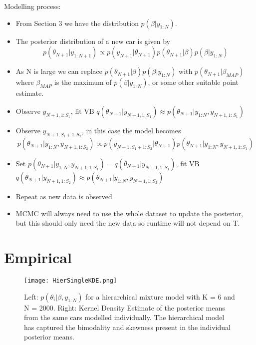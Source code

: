 \documentclass[12pt,a4paper]{article}\usepackage[]{graphicx}\usepackage[]{color}
\begin{document}
Modelling process:
\begin{itemize}
\item From Section 3 we have the distribution $p(\beta | y_{1:N})$.
\item The posterior distribution of a new car is given by
\begin{equation}
p(\theta_{N+1} | y_{1:N+1}) \propto p(y_{N+1} | \theta_{N+1}) p(\theta_{N+1} | \beta) p (\beta | y_{1:N})
\end{equation}
\item As N is large we can replace $ p(\theta_{N+1} | \beta) p (\beta | y_{1:N})$ with $ p(\theta_{N+1} | \beta_{MAP})$ where $\beta_{MAP}$ is the maximum of $ p (\beta | y_{1:N})$, or some other suitable point estimate.
\item Observe $y_{N+1, 1:S_1}$, fit VB $q(\theta_{N+1} | y_{N+1, 1:S_1}) \approx p(\theta_{N+1} | y_{1:N}, y_{N+1, 1:S_1})$
\item Observe $y_{N+1, S_1+1:S_2}$, in this case the model becomes
\begin{equation}
p(\theta_{N+1} | y_{1:N}, y_{N+1, 1:S_2}) \propto p(y_{N+1, S_1+1:S_2} | \theta_{N+1})p(\theta_{N+1} |  y_{1:N}, y_{N+1, 1:S_1})
\end{equation}
\item Set $p(\theta_{N+1} |  y_{1:N}, y_{N+1, 1:S_1}) = q(\theta_{N+1} | y_{N+1, 1:S_1})$, fit VB  $q(\theta_{N+1} | y_{N+1, 1:S_2}) \approx p(\theta_{N+1} | y_{1:N}, y_{N+1, 1:S_2})$
\item Repeat as new data is observed
\item MCMC will always need to use the whole dataset to update the posterior, but this should only need the new data so runtime will not depend on T.
\end{itemize}

\section{Empirical}

\begin{figure}[h]
\centering
\texttt{[image: HierSingleKDE.png]}
\caption{Left: $p(\theta_i | \beta, y_{1:N})$ for a hierarchical mixture model with K = 6 and N = 2000. Right: Kernel Density Estimate of the posterior means from the same cars modelled individually. The hierarchical model has captured the bimodality and skewness present in the individual posterior means.}
\label{fig:HierSingleKDE}
\end{figure}
\end{document}
